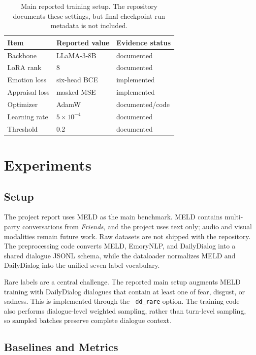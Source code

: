 \documentclass[11pt]{article}
\begin{document}
\begin{table}[t]
\centering
\small
\begin{tabular}{lll}
\toprule
Item & Reported value & Evidence status \\
\midrule
Backbone & LLaMA-3-8B & documented \\
LoRA rank & 8 & documented \\
Emotion loss & six-head BCE & implemented \\
Appraisal loss & masked MSE & implemented \\
Optimizer & AdamW & documented/code \\
Learning rate & $5\times10^{-4}$ & documented \\
Threshold & 0.2 & documented \\
\bottomrule
\end{tabular}
\caption{Main reported training setup. The repository documents these settings, but final checkpoint run metadata is not included.}
\label{tab:setup}
\end{table}

\section{Experiments}

\subsection{Setup}

The project report uses MELD as the main benchmark. MELD contains multi-party conversations from \textit{Friends}, and the project uses text only; audio and visual modalities remain future work. Raw datasets are not shipped with the repository. The preprocessing code converts MELD, EmoryNLP, and DailyDialog into a shared dialogue JSONL schema, while the dataloader normalizes MELD and DailyDialog into the unified seven-label vocabulary.

Rare labels are a central challenge. The reported main setup augments MELD training with DailyDialog dialogues that contain at least one of fear, disgust, or sadness. This is implemented through the \texttt{--dd\_rare} option. The training code also performs dialogue-level weighted sampling, rather than turn-level sampling, so sampled batches preserve complete dialogue context.

\subsection{Baselines and Metrics}
\end{document}

